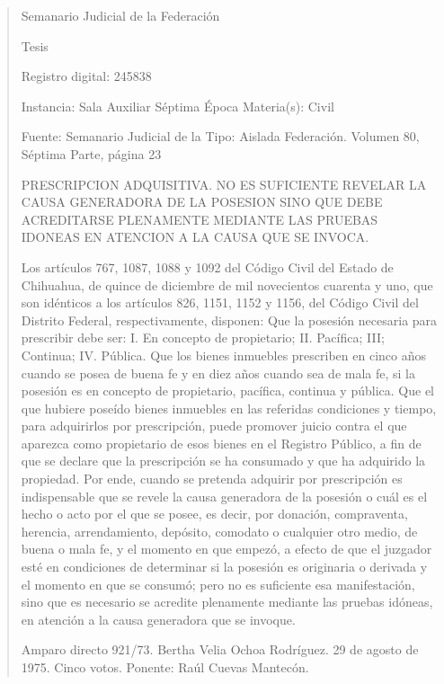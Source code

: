 \documentclass[11pt,a4paper]{article}
\begin{document}
\begin{quote}
                                                   Semanario Judicial de la Federación

                                                  Tesis

 Registro digital: 245838

 Instancia: Sala Auxiliar           Séptima Época                          Materia(s): Civil

                                    Fuente: Semanario Judicial de la  Tipo: Aislada
                                    Federación.
                                    Volumen 80, Séptima Parte, página
                                    23


PRESCRIPCION ADQUISITIVA. NO ES SUFICIENTE REVELAR LA CAUSA GENERADORA DE
LA POSESION SINO QUE DEBE ACREDITARSE PLENAMENTE MEDIANTE LAS PRUEBAS
IDONEAS EN ATENCION A LA CAUSA QUE SE INVOCA.


Los artículos 767, 1087, 1088 y 1092 del Código Civil del Estado de Chihuahua, de quince de
diciembre de mil novecientos cuarenta y uno, que son idénticos a los artículos 826, 1151, 1152 y
1156, del Código Civil del Distrito Federal, respectivamente, disponen: Que la posesión necesaria
para prescribir debe ser: I. En concepto de propietario; II. Pacífica; III; Continua; IV. Pública. Que los
bienes inmuebles prescriben en cinco años cuando se posea de buena fe y en diez años cuando
sea de mala fe, si la posesión es en concepto de propietario, pacífica, continua y pública. Que el
que hubiere poseído bienes inmuebles en las referidas condiciones y tiempo, para adquirirlos por
prescripción, puede promover juicio contra el que aparezca como propietario de esos bienes en el
Registro Público, a fin de que se declare que la prescripción se ha consumado y que ha adquirido la
propiedad. Por ende, cuando se pretenda adquirir por prescripción es indispensable que se revele la
causa generadora de la posesión o cuál es el hecho o acto por el que se posee, es decir, por
donación, compraventa, herencia, arrendamiento, depósito, comodato o cualquier otro medio, de
buena o mala fe, y el momento en que empezó, a efecto de que el juzgador esté en condiciones de
determinar si la posesión es originaria o derivada y el momento en que se consumó; pero no es
suficiente esa manifestación, sino que es necesario se acredite plenamente mediante las pruebas
idóneas, en atención a la causa generadora que se invoque.


Amparo directo 921/73. Bertha Velia Ochoa Rodríguez. 29 de agosto de 1975. Cinco votos.
Ponente: Raúl Cuevas Mantecón.


\end{quote}
\end{document}
